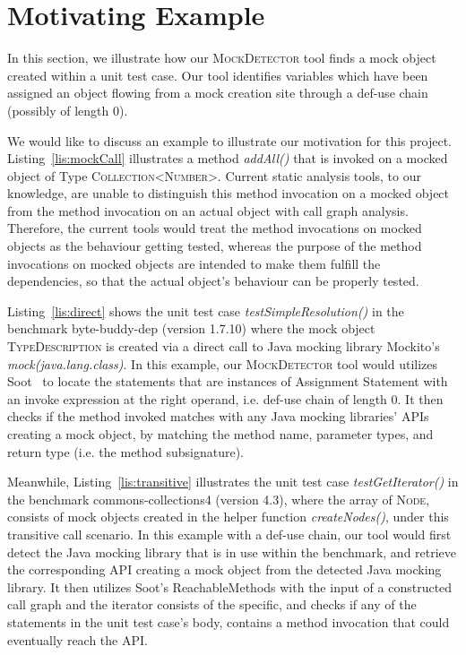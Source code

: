 \section{Motivating Example}
\label{sec:motivating-example}

In this section, we illustrate how our \textsc{MockDetector} tool finds a mock object created within a unit test case. Our tool identifies variables which have been assigned an object flowing from a mock creation site through a def-use chain (possibly of length 0).

We would like to discuss an example to illustrate our motivation for this project. Listing~\ref{lis:mockCall} illustrates a method \textit{addAll()} that is invoked on a mocked object of Type \textsc{Collection<Number>}. Current static analysis tools, to our knowledge, are unable to distinguish this method invocation on a mocked object from the method invocation on an actual object with call graph analysis. Therefore, the current tools would treat the method invocations on mocked objects as the behaviour getting tested, whereas the purpose of the method invocations on mocked objects are intended to make them fulfill the dependencies, so that the actual object's behaviour can be properly tested.

Listing~\ref{lis:direct} shows the unit test case \textit{testSimpleResolution()} in the benchmark byte-buddy-dep (version 1.7.10) where the mock object \textsc{TypeDescription} is created via a direct call to Java mocking library Mockito's \textit{mock(java.lang.class)}. In this example, our \textsc{MockDetector} tool would utilizes Soot~\cite{Vallee-Rai:1999:SJB:781995.782008} to locate the statements that are instances of Assignment Statement with an invoke expression at the right operand, i.e. def-use chain of length 0. It then checks if the method invoked matches with any Java mocking libraries' APIs creating a mock object, by matching the method name, parameter types, and return type (i.e. the method subsignature).

Meanwhile, Listing~\ref{lis:transitive} illustrates the unit test case \textit{testGetIterator()} in the benchmark commons-collections4 (version 4.3), where the array of \textsc{Node}, consists of mock objects created in the helper function \textit{createNodes()}, under this transitive call scenario. In this example with a def-use chain, our tool would first detect the Java mocking library that is in use within the benchmark, and retrieve the corresponding API creating a mock object from the detected Java mocking library. It then utilizes Soot's ReachableMethods with the input of a constructed call graph and the iterator consists of the specific, and checks if any of the statements in the unit test case's body, contains a method invocation that could eventually reach the API. 

